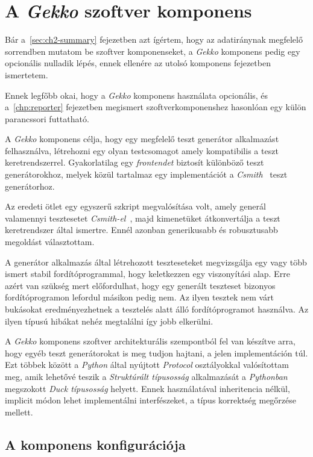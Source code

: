 \section{A \textit{Gekko} szoftver komponens}

    Bár a~\ref{sec:ch2-summary} fejezetben azt ígértem, hogy az adatiránynak megfelelő sorrendben mutatom be szoftver
    komponenseket, a \textit{Gekko} komponens pedig egy opcionális nulladik lépés, ennek ellenére az utolsó komponens
    fejezetben ismertetem.

    Ennek legfőbb okai, hogy a \textit{Gekko} komponens használata opcionális, és a~\ref{chp:reporter} fejezetben
    megismert szoftverkomponenshez hasonlóan egy külön parancssori futtatható.

    A \textit{Gekko} komponens célja, hogy egy megfelelő teszt generátor alkalmazást felhasználva, létrehozni egy olyan
    testcsomagot amely kompatibilis a teszt keretrendszerrel. Gyakorlatilag egy \textit{frontendet} biztosít különböző
    teszt generátorokhoz, melyek közül tartalmaz egy implementációt a \textit{Csmith}~\cite{csmith} teszt generátorhoz.

    Az eredeti ötlet egy egyszerű szkript megvalósítása volt, amely generál valamennyi tesztesetet
    \textit{Csmith-el}~\cite{csmith}, majd kimenetüket átkonvertálja a teszt keretrendszer által ismertre. Ennél
    azonban generikusabb és robusztusabb megoldást választottam.

    A generátor alkalmazás által létrehozott teszteseteket megvizsgálja egy vagy több ismert stabil fordítóprogrammal,
    hogy keletkezzen egy viszonyítási alap. Erre azért van szükség mert előfordulhat, hogy egy generált teszteset
    bizonyos fordítóprogramon lefordul másikon pedig nem. Az ilyen tesztek nem várt bukásokat eredményezhetnek a
    tesztelés alatt álló fordítóprogramot használva. Az ilyen típusú hibákat nehéz megtalálni így jobb elkerülni.

    A \textit{Gekko} komponens szoftver architekturális szempontból fel van készítve arra, hogy egyéb teszt
    generátorokat is meg tudjon hajtani, a jelen implementáción túl. Ezt többek között a \textit{Python} által nyújtott
    \textit{Protocol} osztályokkal valósítottam meg, amik lehetővé teszik a \textit{Struktúrált típusosság}
    alkalmazását a \textit{Pythonban} megszokott \textit{Duck típusosság} helyett. Ennek használatával inheritencia
    nélkül, implicit módon lehet implementálni interfészeket, a típus korrektség megőrzése mellett.

    \subsection{A komponens konfigurációja}

